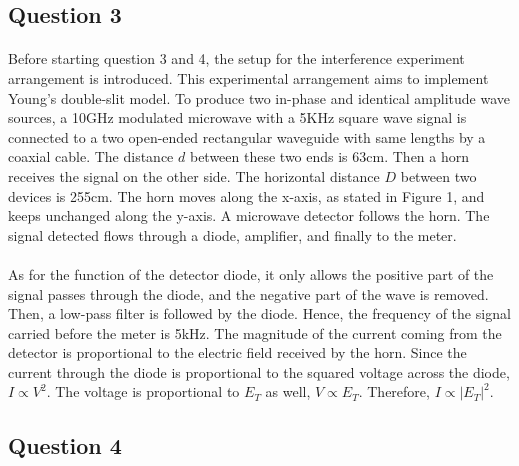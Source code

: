 \documentclass[12pt]{article}
\begin{document}
    \subsection{Question 3}
    \paragraph{}
    Before starting question 3 and 4, the setup for the interference experiment arrangement is introduced. This experimental arrangement aims to implement Young's double-slit model. To produce two in-phase and identical amplitude wave sources, a 10GHz modulated microwave with a 5KHz  square wave signal is connected to a two open-ended rectangular waveguide with same lengths by a coaxial cable. The distance $d$ between these two ends is 63cm. Then a horn receives the signal on the other side. The horizontal distance $D$ between two devices is 255cm. The horn moves along the x-axis, as stated in Figure 1, and keeps unchanged along the y-axis. A microwave detector follows the horn. The signal detected flows through a diode, amplifier, and finally to the meter.
    
    \paragraph{}
    As for the function of the detector diode, it only allows the positive part of the signal passes through the diode, and the negative part of the wave is removed. Then, a low-pass filter is followed by the diode. Hence, the frequency of the signal carried before the meter is 5kHz. The magnitude of the current coming from the detector is proportional to the electric field received by the horn. Since the current through the diode is proportional to the squared voltage across the diode, $I\propto V^2$. The voltage is proportional to $E_T$ as well, $V\propto E_T$. Therefore, $I\propto |E_T|^2$.

    
    
    \subsection{Question 4}
\end{document}
